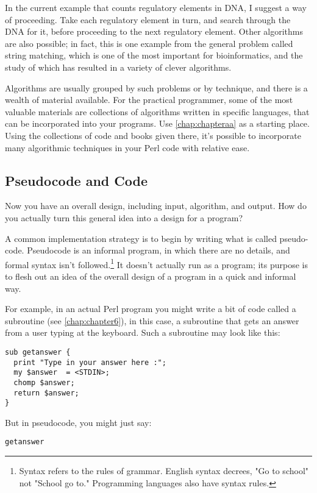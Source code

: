 In the current example that counts regulatory elements in DNA, I suggest a way of proceeding. Take each regulatory element in turn, and search through the DNA for it, before proceeding to the next regulatory element. Other algorithms are also possible; in fact, this is one example from the general problem called string matching, which is one of the most important for bioinformatics, and the study of which has resulted in a variety of clever algorithms.

Algorithms are usually grouped by such problems or by technique, and there is a wealth of material available. For the practical programmer, some of the most valuable materials are collections of algorithms written in specific languages, that can be incorporated into your programs. Use \autoref{chap:chapteraa} as a starting place. Using the collections of code and books given there, it's possible to incorporate many algorithmic techniques in your Perl code with relative ease. 

\subsection{Pseudocode and Code}
Now you have an overall design, including input, algorithm, and output. How do you actually turn this general idea into a design for a program?

A common implementation strategy is to begin by writing what is called pseudo-code. Pseudocode is an informal program, in which there are no details, and formal syntax isn't followed.\footnote{Syntax refers to the rules of grammar. English syntax decrees, "Go to school" not "School go to." Programming languages also have syntax rules.} It doesn't actually run as a program; its purpose is to flesh out an idea of the overall design of a program in a quick and informal way.

For example, in an actual Perl program you might write a bit of code called a subroutine (see \autoref{chap:chapter6}), in this case, a subroutine that gets an answer from a user typing at the keyboard. Such a subroutine may look like this: 

\begin{lstlisting}
sub getanswer {
  print "Type in your answer here :";
  my $answer  = <STDIN>;
  chomp $answer;
  return $answer;
}
\end{lstlisting}

But in pseudocode, you might just say:

\begin{lstlisting}
getanswer
\end{lstlisting}

